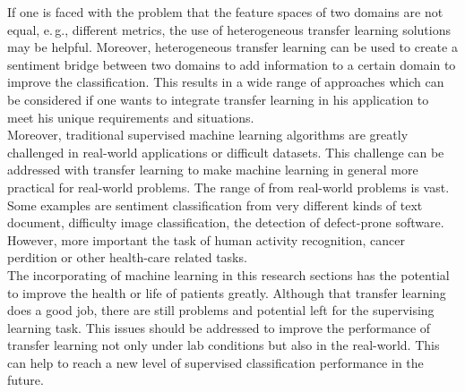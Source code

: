 If one is faced with the problem that the feature spaces of two domains are not equal, e.\,g., different metrics, the use of heterogeneous transfer learning solutions may be helpful.
Moreover, heterogeneous transfer learning can be used to create a sentiment bridge between two domains to add information to a certain domain to improve the classification.
This results in a wide range of approaches which can be considered if one wants to integrate transfer learning in his application to meet his unique requirements and situations.\\
Moreover, traditional supervised machine learning algorithms are greatly challenged in real-world applications or difficult datasets.\cite{Pan.2010}
This challenge can be addressed with transfer learning to make machine learning in general more practical for real-world problems.
The range of from real-world problems is vast.
Some examples are sentiment classification from very different kinds of text document, difficulty image classification, the detection of defect-prone software.\cite{Weiss.2016}
However, more important the task of human activity recognition, cancer perdition or other health-care related tasks.\cite{Burlina.2017}\cite{Kourou.2015}\\
The incorporating of machine learning in this research sections has the potential to improve the health or life of patients greatly.
Although that transfer learning does a good job, there are still problems and potential left for the supervising learning task.
This issues should be addressed to improve the performance of transfer learning not only under lab conditions but also in the real-world.
This can help to reach a new level of supervised classification performance in the future.
